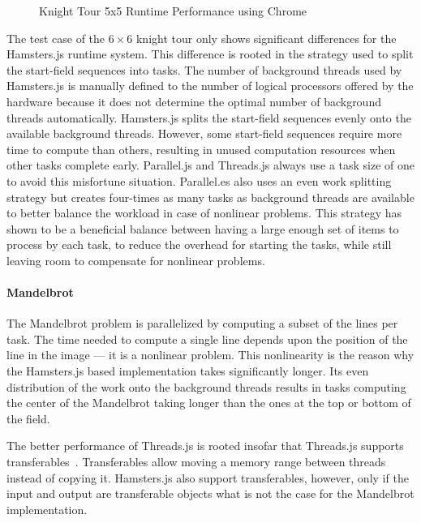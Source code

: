 \begin{figure}
	\centering
	
	\caption{Knight Tour 5x5 Runtime Performance using Chrome}
	\label{fig:runtime-performance-chrome}
\end{figure}

The test case of the $6\times6$ knight tour only shows significant differences for the Hamsters.js runtime system. This difference is rooted in the strategy used to split the start-field sequences into tasks. The number of background threads used by Hamsters.js is manually defined to the number of logical processors offered by the hardware because it does not determine the optimal number of background threads automatically. Hamsters.js splits the start-field sequences evenly onto the available background threads. However, some start-field sequences require more time to compute than others, resulting in unused computation resources when other tasks complete early. Parallel.js and Threads.js always use a task size of one to avoid this misfortune situation. Parallel.es also uses an even work splitting strategy but creates four-times as many tasks as background threads are available to better balance the workload in case of nonlinear problems. This strategy has shown to be a beneficial balance between having a large enough set of items to process by each task, to reduce the overhead for starting the tasks, while still leaving room to compensate for nonlinear problems. 

\paragraph{Mandelbrot}
The Mandelbrot problem is parallelized by computing a subset of the lines per task. The time needed to compute a single line depends upon the position of the line in the image --- it is a nonlinear problem. This nonlinearity is the reason why the Hamsters.js based implementation takes significantly longer. Its even distribution of the work onto the background threads results in tasks computing the center of the Mandelbrot taking longer than the ones at the top or bottom of the field. 

The better performance of Threads.js is rooted insofar that Threads.js supports transferables~\cite[Section 2.7.4]{w3cHtml5}. Transferables allow moving a memory range between threads instead of copying it. Hamsters.js also support transferables, however, only if the input and output are transferable objects what is not the case for the Mandelbrot implementation.

